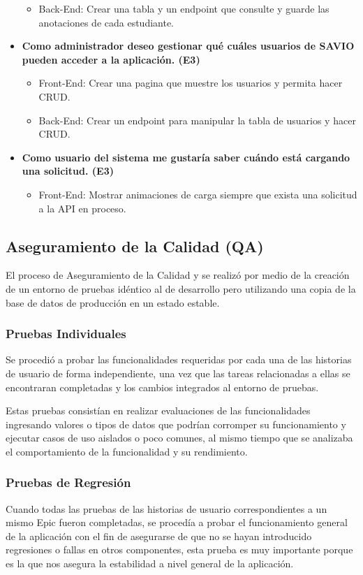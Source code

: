 \begin{itemize}
\begin{itemize}
            \item Back-End: Crear una tabla y un endpoint que consulte y guarde las anotaciones de cada estudiante.
        \end{itemize}
    \item \textbf{Como administrador deseo gestionar qué cuáles usuarios de SAVIO pueden acceder a la aplicación. (E3)}
        \begin{itemize}
            \item Front-End: Crear una pagina que muestre los usuarios y permita hacer CRUD.
            \item Back-End: Crear un endpoint para manipular la tabla de usuarios y hacer CRUD.
        \end{itemize}
    \item \textbf{Como usuario del sistema me gustaría saber cuándo está cargando una solicitud. (E3)}
        \begin{itemize}
            \item Front-End: Mostrar animaciones de carga siempre que exista una solicitud a la API en proceso.
        \end{itemize}
\end{itemize}

\subsection{Aseguramiento de la Calidad (QA)}
El proceso de Aseguramiento de la Calidad y se realizó por medio de la creación de un entorno de pruebas idéntico al de desarrollo pero utilizando una copia de la base de datos de producción en un estado estable. 

\subsubsection{Pruebas Individuales}
Se procedió a probar las funcionalidades requeridas por cada una de las historias de usuario de forma independiente,
una vez que las tareas relacionadas a ellas se encontraran completadas y los cambios integrados al entorno de pruebas.

Estas pruebas consistían en realizar evaluaciones de las funcionalidades ingresando valores o tipos de datos que podrían corromper su funcionamiento y ejecutar casos de uso aislados o poco comunes, al mismo tiempo que se analizaba el comportamiento de la funcionalidad y su rendimiento. 

\subsubsection{Pruebas de Regresión}
Cuando todas las pruebas de las historias de usuario correspondientes a un mismo Epic fueron completadas, se procedía a probar el funcionamiento general de la aplicación con el fin de asegurarse de que no se hayan introducido regresiones o fallas en otros componentes, esta prueba es muy importante porque es la que nos asegura la estabilidad a nivel general de la aplicación. 
